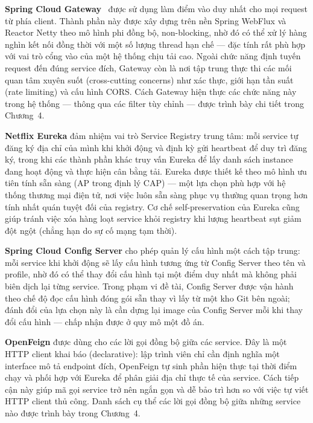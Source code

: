 \documentclass[../DoAn.tex]{subfiles}
\begin{document}
\textbf{Spring Cloud Gateway}~\cite{springcloud_docs} được sử dụng làm điểm vào duy nhất cho
mọi request từ phía client. Thành phần này được xây dựng trên nền Spring WebFlux và Reactor
Netty theo mô hình phi đồng bộ, non-blocking, nhờ đó có thể xử lý hàng nghìn kết nối đồng
thời với một số lượng thread hạn chế --- đặc tính rất phù hợp với vai trò cổng vào của một
hệ thống chịu tải cao. Ngoài chức năng định tuyến request đến đúng service đích, Gateway còn
là nơi tập trung thực thi các mối quan tâm xuyên suốt (cross-cutting concerns) như xác thực,
giới hạn tần suất (rate limiting) và cấu hình CORS. Cách Gateway hiện thực các chức năng này
trong hệ thống --- thông qua các filter tùy chỉnh --- được trình bày chi tiết trong Chương~4.

\textbf{Netflix Eureka} đảm nhiệm vai trò Service Registry trung tâm: mỗi service tự đăng ký
địa chỉ của mình khi khởi động và định kỳ gửi heartbeat để duy trì đăng ký, trong khi các
thành phần khác truy vấn Eureka để lấy danh sách instance đang hoạt động và thực hiện cân
bằng tải. Eureka được thiết kế theo mô hình ưu tiên tính sẵn sàng (AP trong định lý CAP) ---
một lựa chọn phù hợp với hệ thống thương mại điện tử, nơi việc luôn sẵn sàng phục vụ thường
quan trọng hơn tính nhất quán tuyệt đối của registry. Cơ chế self-preservation của Eureka
cũng giúp tránh việc xóa hàng loạt service khỏi registry khi lượng heartbeat sụt giảm đột
ngột (chẳng hạn do sự cố mạng tạm thời).

\textbf{Spring Cloud Config Server} cho phép quản lý cấu hình một cách tập trung: mỗi service
khi khởi động sẽ lấy cấu hình tương ứng từ Config Server theo tên và profile, nhờ đó có thể
thay đổi cấu hình tại một điểm duy nhất mà không phải biên dịch lại từng service. Trong phạm
vi đề tài, Config Server được vận hành theo chế độ đọc cấu hình đóng gói sẵn thay vì lấy từ
một kho Git bên ngoài; đánh đổi của lựa chọn này là cần dựng lại image của Config Server mỗi
khi thay đổi cấu hình --- chấp nhận được ở quy mô một đồ án.

\textbf{OpenFeign} được dùng cho các lời gọi đồng bộ giữa các service. Đây là một HTTP client
khai báo (declarative): lập trình viên chỉ cần định nghĩa một interface mô tả endpoint đích,
OpenFeign tự sinh phần hiện thực tại thời điểm chạy và phối hợp với Eureka để phân giải địa
chỉ thực tế của service. Cách tiếp cận này giúp mã gọi service trở nên ngắn gọn và dễ bảo
trì hơn so với việc tự viết HTTP client thủ công. Danh sách cụ thể các lời gọi đồng bộ giữa
những service nào được trình bày trong Chương~4.
\end{document}
